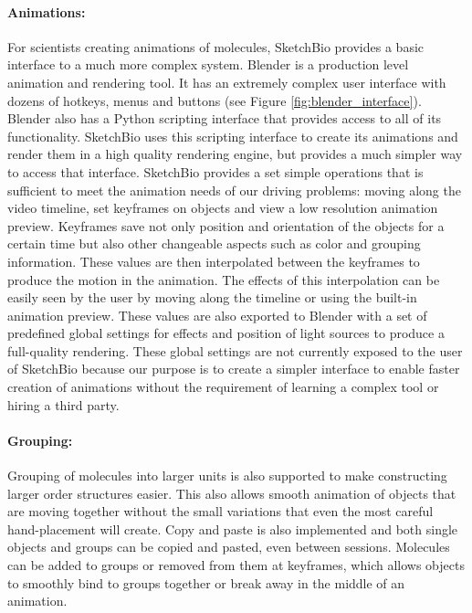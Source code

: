 \documentclass[twocolumn]{bmcart}%
\begin{document}
\paragraph*{Animations:}
For scientists creating animations of molecules, SketchBio provides a basic interface to a much more complex system.
Blender is a production level animation and rendering tool.  It has an extremely complex user interface with dozens of hotkeys, menus and buttons (see Figure \ref{fig:blender_interface}).
Blender also has a Python scripting interface that provides access to all of its functionality.
SketchBio uses this scripting interface to create its animations and render them in a high quality rendering engine, but provides a much simpler way to access that interface.
SketchBio provides a set simple operations that is sufficient to meet the animation needs of our driving problems: moving along the video timeline, set keyframes on objects and view a low resolution animation preview.
Keyframes save not only position and orientation of the objects for a certain time but also other changeable aspects such as color and grouping information.
These values are then interpolated between the keyframes to produce the motion in the animation.
The effects of this interpolation can be easily seen by the user by moving along the timeline or using the built-in animation preview.
These values are also exported to Blender with a set of predefined global settings for effects and position of light sources to produce a full-quality rendering.
These global settings are not currently exposed to the user of SketchBio because our purpose is to create a simpler interface to enable faster creation of animations without the requirement of learning a complex tool or hiring a third party.

\paragraph*{Grouping:}
Grouping of molecules into larger units is also supported to make constructing larger order structures easier.
This also allows smooth animation of objects that are moving together without the small variations that even the most careful hand-placement will create.
Copy and paste is also implemented and both single objects and groups can be copied and pasted, even between sessions.
Molecules can be added to groups or removed from them at keyframes, which allows objects to smoothly bind to groups together or break away in the middle of an animation.
\end{document}
